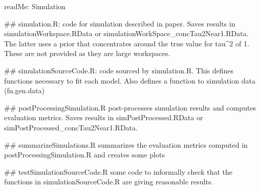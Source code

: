 readMe: Simulation


##
simulation.R: code for simulation described in paper. Saves results in simulationWorkspace.RData or simulationWorkSpace_concTau2Near1.RData. The latter uses a prior that concentrates around the true value for tau^{2} of 1. These are not provided as they are large workspaces. 

##
simulationSourceCode.R: code sourced by simulation.R. This defines functions necessary to fit each model. Also defines a function to simulation data (fn.gen.data)


##
postProcessingSimulation.R
post-processes simulation results and computes evaluation metrics. Saves results in simPostProcessed.RData or simPostProcessed_concTau2Near1.RData.

##
summarizeSimulations.R
summarizes the evaluation metrics computed in postProcessingSimulation.R and creates some plots


##
testSimulationSourceCode.R
some code to informally check that the functions in simulationSourceCode.R are giving reasonable results. 